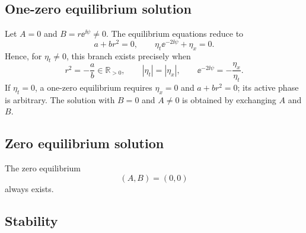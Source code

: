 \subsection{One-zero equilibrium solution}

Let $A=0$ and $B=r\ee^{\ii\psi}\neq0$.  The equilibrium equations reduce
to
\begin{equation}
 a+br^2=0,
 \qquad
 \eta_t\ee^{-2\ii\psi}+\eta_x=0.
 \label{eq:B-only-balance}
\end{equation}
Hence, for $\eta_t\neq0$, this branch exists precisely when
\begin{equation}
 r^2=-\frac ab\in\mathbb R_{>0},
 \qquad
 |\eta_t|=|\eta_x|,
 \qquad
 \ee^{-2\ii\psi}=-\frac{\eta_x}{\eta_t}.
 \label{eq:B-only-solution}
\end{equation}
If $\eta_t=0$, a one-zero equilibrium requires $\eta_x=0$ and
$a+br^2=0$; its active phase is arbitrary.  The solution with $B=0$ and
$A\neq0$ is obtained by exchanging $A$ and $B$.

\subsection{Zero equilibrium solution}

The zero equilibrium
\begin{equation}
 (A,B)=(0,0)
 \label{eq:zero-equilibrium}
\end{equation}
always exists.

\subsection{Stability}

